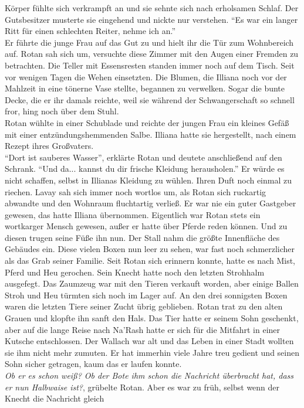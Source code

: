 Körper fühlte sich verkrampft an und sie sehnte sich nach erholsamen Schlaf. Der Gutsbesitzer 
musterte sie eingehend und nickte nur verstehen. ``Es war ein langer Ritt für einen schlechten 
Reiter, nehme ich an.''\\
Er führte die junge Frau auf das Gut zu und hielt ihr die Tür zum Wohnbereich auf. Rotan sah sich 
um, versuchte diese Zimmer mit den Augen einer Fremden zu betrachten. Die Teller mit Essensresten 
standen immer noch auf dem Tisch. Seit vor wenigen Tagen die Wehen einsetzten. Die Blumen, die 
Illiana noch vor der Mahlzeit in eine tönerne Vase stellte, begannen zu verwelken. Sogar die bunte 
Decke, die er ihr damals reichte, weil sie während der Schwangerschaft so schnell fror, hing noch 
über dem Stuhl.\\
Rotan wühlte in einer Schublade und reichte der jungen Frau ein kleines Gefäß mit einer 
entzündungshemmenden Salbe. Illiana hatte sie hergestellt, nach einem Rezept ihres Großvaters.\\
``Dort ist sauberes Wasser'', erklärte Rotan und deutete anschließend auf den Schrank. ``Und da... 
kannst du dir frische Kleidung herausholen.'' Er würde es nicht schaffen, selbst in Illianas 
Kleidung zu wühlen. Ihren Duft noch einmal zu riechen. Lavay sah sich immer noch wortlos um, als 
Rotan sich ruckartig abwandte und den Wohnraum fluchtartig verließ. Er war nie ein guter Gastgeber 
gewesen, das hatte Illiana übernommen. Eigentlich war Rotan stets ein wortkarger Mensch gewesen, 
außer er hatte über Pferde reden können. Und zu diesen trugen seine Füße ihn nun. Der Stall nahm 
die größte Innenfläche des Gebäudes ein. Diese vielen Boxen nun leer zu sehen, war fast noch 
schmerzlicher als das Grab seiner Familie. Seit Rotan sich erinnern konnte, hatte es nach Mist, 
Pferd und Heu gerochen. Sein Knecht hatte noch den letzten Strohhalm ausgefegt. Das Zaumzeug war 
mit den Tieren verkauft worden, aber einige Ballen Stroh und Heu türmten sich noch im Lager auf. An 
den drei sonnigsten Boxen waren die letzten Tiere seiner Zucht übrig geblieben. Rotan trat zu den 
alten Grauen und klopfte ihn sanft den Hals. Das Tier hatte er seinem Sohn geschenkt, aber auf die 
lange Reise nach Na'Rash hatte er sich für die Mitfahrt in einer Kutsche entschlossen. Der Wallach 
war alt und das Leben in einer Stadt wollten sie ihm nicht mehr zumuten. Er hat immerhin viele 
Jahre treu gedient und seinen Sohn sicher getragen, kaum das er laufen konnte.\\
\textit{Ob er es schon weiß? Ob der Bote ihm schon die Nachricht überbracht hat, dass er nun 
Halbwaise ist?}, grübelte Rotan. Aber es war zu früh, selbst wenn der Knecht die Nachricht gleich 
